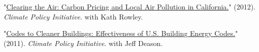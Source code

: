 \documentclass[11pt,letterpaper]{article}
\newcommand{\horse}{5pt} 	%
\newcommand{\littlehorse}{5pt}%
\newenvironment{itemize*}%
  {\begin{itemize}[topsep=0pt, partopsep=0pt, leftmargin=1.6em, itemindent=-1.6em, labelsep=0pt, labelwidth=0pt]%
    \setlength{\itemsep}{\littlehorse}%
    \setlength{\parskip}{0pt}%
    \interlinepenalty=10000}%
  {\end{itemize}\vspace{\horse}}
\newcommand{\resheading}[1]{%
  \vspace{6pt}%
  {\textbf{\large #1}}%
  \par\vspace{4pt}}
\begin{document}
\begin{itemize*}
  \item[]{"\href{http://climatepolicyinitiative.org/publication/clearing-the-air-carbon-pricing-and-local-air-pollution-in-california/}{Clearing the Air: Carbon Pricing and Local Air Pollution in California.}"  (2012). \textit{Climate Policy Initiative}. with Kath Rowley.}

  \item[]{"\href{http://climatepolicyinitiative.org/publication/codes-to-cleaner-buildings-effectiveness-of-u-s-building-energy-codes/}{Codes to Cleaner Buildings: Effectiveness of U.S. Building Energy Codes.}"  (2011). \textit{Climate Policy Initiative}. with Jeff Deason.}

\end{itemize*}

\end{document}
